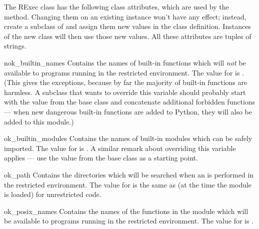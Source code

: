 The RExec class has the following class attributes, which are used by the
 method.  Changing them on an existing instance won't
have any effect; instead, create a subclass of  and assign
them new values in the class definition.  Instances of the new class
will then use those new values.  All these attributes are tuples of
strings.

\renewcommand{\indexsubitem}{(RExec object attribute)}
\begin{datadesc}{nok_builtin_names}
Contains the names of built-in functions which will \emph{not} be
available to programs running in the restricted environment.  The
value for  is  
.  (This gives the exceptions, because by far the
majority of built-in functions are harmless.  A subclass that wants to
override this variable should probably start with the value from the
base class and concatenate additional forbidden functions --- when new
dangerous built-in functions are added to Python, they will also be
added to this module.)
\end{datadesc}

\begin{datadesc}{ok_builtin_modules}
Contains the names of built-in modules which can be safely imported.
The value for  is  
   
   
   
  .  A similar remark
about overriding this variable applies --- use the value from the base
class as a starting point.
\end{datadesc}

\begin{datadesc}{ok_path}
Contains the directories which will be searched when an 
is performed in the restricted environment.  
The value for  is the same as  (at the time
the module is loaded) for unrestricted code.
\end{datadesc}

\begin{datadesc}{ok_posix_names}
Contains the names of the functions in the  module which will be
available to programs running in the restricted environment.  The
value for  is  
   
   
   
.
\end{datadesc}

